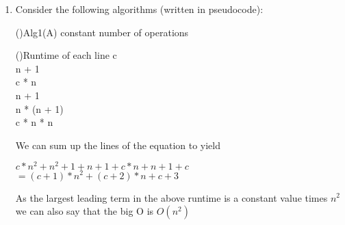 \documentclass[11pt]{amsart}
\begin{document}
\begin{enumerate}
\begin{enumerate}
\end{enumerate}

\bigskip
\newpage
\item Consider the following algorithms (written in pseudocode):

\smallskip

\begin{algorithm}[H]
\Fn(){Alg1(A)}{
\SetAlgoLined
\SetNoFillComment
\DontPrintSemicolon
	constant number of operations \\
}
\end{algorithm}
\begin{algorithm}[H]
	\Fn(){Runtime of each line}{
	\SetAlgoLined
	\SetNoFillComment
	\DontPrintSemicolon
		c\\
		n + 1\\
		c * n\\
		n + 1\\
		n * (n + 1)\\
		c * n * n
	}
\end{algorithm}

\bigskip
We can sum up the lines of the equation to yield\\
\begin{center}
	$c*n^2+n^2+1+n+1+c * n + n + 1 + c$\\
	$ = (c + 1) * n^2 + (c + 2) * n + c + 3$\\
\end{center}
As the largest leading term in the above runtime is a constant value times $n^2$ we can also say that the big O is $O(n^2)$
\bigskip


\end{enumerate}
\end{document}
